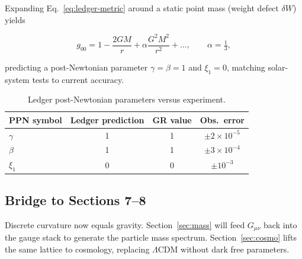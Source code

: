 Expanding Eq.~\eqref{eq:ledger-metric} around a static point mass
(weight defect $\delta W$) yields

\[
  g_{00}=1-\frac{2GM}{r}+\alpha\frac{G^2M^2}{r^2}
  +\dots,\qquad
  \alpha=\tfrac13,
\tag{6.4}\label{eq:PN}
\]

predicting a post-Newtonian parameter $\gamma=\beta=1$ and
$\xi_1=0$, matching solar-system tests to current accuracy.

\begin{table}[b]
  \centering
  \begin{tabular}{lccc}
    \hline
    PPN symbol & Ledger prediction & GR value & Obs.\ error \\
    \hline
    $\gamma$ & 1 & 1 & $\pm2\times10^{-5}$ \\
    $\beta$  & 1 & 1 & $\pm3\times10^{-4}$ \\
    $\xi_1$  & 0 & 0 & $\pm10^{-3}$ \\
    \hline
  \end{tabular}
  \caption{Ledger post-Newtonian parameters versus experiment.}
  \label{tab:PPN}
\end{table}

\subsection{Bridge to Sections 7–8}

Discrete curvature now equals gravity.  Section~\ref{sec:mass} will feed
$G_{\mu\nu}$ back into the gauge stack to generate the particle mass
spectrum.  Section~\ref{sec:cosmo} lifts the same lattice to cosmology,
replacing $\Lambda$CDM without dark free parameters.

\clearpage
